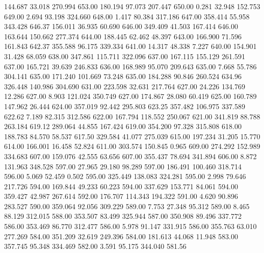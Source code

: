  144.687   33.018  270.994       653.00
 180.194   97.073  207.447       650.00
   0.281   32.948  152.753       649.00
   2.694   93.198  324.660       648.00
   1.417   80.384  317.186       647.00
 358.414   55.958  343.428       646.37
 156.011   36.935   60.690       646.00
 349.409   41.503  167.414       646.00
 163.644  150.662  277.374       644.00
 188.445   62.462   48.397       643.00
 166.900   71.596  161.843       642.37
 355.588   96.175  339.334       641.00
  14.317   48.338    7.227       640.00
 154.901   31.428   68.059       638.00
 347.861  115.711  322.096       637.00
 167.115  155.129  261.591       637.00
 165.721   39.639  246.833       636.00
 168.989   95.070  209.643       635.00
   7.668   55.786  304.141       635.00
 171.240  101.669   73.248       635.00
 184.288   90.846  260.524       634.96
 326.448  140.986  304.690       631.00
 223.598   32.631  217.764       627.00
  24.226  134.769   12.286       627.00
   8.903  121.024  350.749       627.00
 174.867   28.080   60.419       625.00
 160.789  147.962   26.444       624.00
 357.019   92.442  295.803       623.25
 357.482  106.975  337.589       622.62
   7.189   82.315  312.586       622.00
 167.794  118.552  250.067       621.00
 341.819   88.788  263.184       619.12
 289.064   44.855  167.424       619.00
 354.200   97.328  315.808       618.00
 188.783   84.570   58.537       617.50
 329.584   41.077  275.039       615.00
 197.234   31.205   15.770       614.00
 166.001   16.458   52.824       611.00
 303.574  150.845    0.965       609.00
 274.292  152.989  334.683       607.00
 159.076   42.555   63.656       607.00
 355.437   78.694  341.894       606.00
   8.872  131.963  348.528       597.00
  27.965   29.180   98.289       597.00
 186.491  100.460  318.714       596.00
   5.069   52.459    0.502       595.00
 325.449  138.083  324.281       595.00
   2.998   79.646  217.726       594.00
 169.844   49.233   60.223       594.00
 337.629  153.771   84.061       594.00
 359.427   42.987  267.614       592.00
 176.707  114.343  194.322       591.00
   4.620   90.896  283.527       590.00
 359.064   92.056  309.229       589.00
   7.753   27.348   95.312       589.00
   8.465   88.129  312.015       588.00
 353.507   83.499  325.944       587.00
 350.908   89.496  337.772       586.00
 353.469   86.770  312.477       586.00
   5.978   91.147  331.915       586.00
 355.763   63.010  277.269       584.00
 351.209   32.619  249.396       584.00
 181.613   44.068   11.948       583.00
 357.745   95.348  334.469       582.00
   3.591   95.175  344.040       581.56
